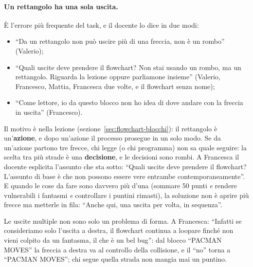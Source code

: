 \paragraph{Un rettangolo ha una sola uscita.} È l'errore più frequente del
task, e il docente lo dice in due modi:
\begin{itemize}
  \item ``Da un rettangolo non può uscire più di una freccia, non è un
        rombo'' (Valerio);
  \item ``Quali uscite deve prendere il flowchart? Non stai usando un rombo, ma
        un rettangolo. Riguarda la lezione oppure parliamone insieme''
        (Valerio, Francesco, Mattia, Francesca due volte, e il flowchart
        senza nome);
  \item ``Come lettore, io da questo blocco non ho idea di dove andare con la
        freccia in uscita'' (Francesco).
\end{itemize}
Il motivo è nella lezione (sezione~\ref{sec:flowchart-blocchi}): il
rettangolo è un'\textbf{azione}, e dopo un'azione il processo prosegue in un
solo modo. Se da un'azione partono tre frecce, chi legge (o chi programma) non
sa quale seguire: la scelta tra più strade è una \textbf{decisione}, e le
decisioni sono rombi. A Francesca il docente esplicita l'assunto che sta sotto:
``Quali uscite deve prendere il flowchart? L'assunto di base è che non possono
essere vere entrambe contemporaneamente''. E quando le cose da fare sono
davvero più d'una (sommare 50 punti \emph{e} rendere vulnerabili i fantasmi
\emph{e} controllare i puntini rimasti), la soluzione non è aprire più frecce
ma metterle in fila: ``Anche qui, una uscita per volta, in sequenza''.

Le uscite multiple non sono solo un problema di forma. A Francesca:
``Infatti se consideriamo solo l'uscita a destra, il flowchart continua a
loopare finché non vieni colpito da un fantasma, il che è un bel bug'': dal
blocco ``PACMAN MOVES'' la freccia a destra va al controllo della collisione,
e il ``no'' torna a ``PACMAN MOVES''; chi segue quella strada non mangia mai
un puntino.

